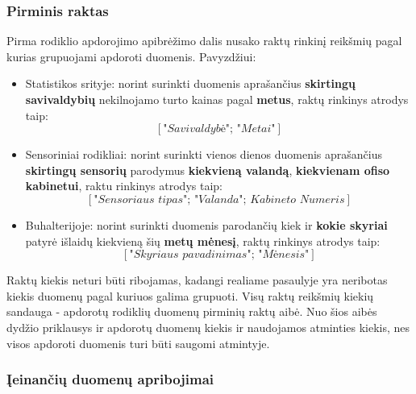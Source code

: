 \documentclass{VUMIFPSbakalaurinis}
\begin{document}
\subsubsection{Pirminis raktas}

Pirma rodiklio apdorojimo apibrėžimo dalis nusako raktų rinkinį reikšmių pagal kurias grupuojami apdoroti duomenis. Pavyzdžiui:
\begin{itemize}
    \item Statistikos srityje: norint surinkti duomenis aprašančius \textbf{skirtingų savivaldybių} nekilnojamo turto kainas pagal \textbf{metus}, raktų rinkinys atrodys taip: \[[\textit{"Savivaldybė"; "Metai"}]\]
    \item Sensoriniai rodikliai: norint surinkti vienos dienos duomenis aprašančius \textbf{skirtingų sensorių} parodymus \textbf{kiekvieną valandą}, \textbf{kiekvienam ofiso kabinetui}, raktu rinkinys atrodys taip: \[[\textit{"Sensoriaus tipas"; "Valanda"; Kabineto Numeris}]\] 
    \item Buhalterijoje: norint surinkti duomenis parodančių kiek ir \textbf{kokie skyriai} patyrė išlaidų kiekvieną šių \textbf{metų mėnesį}, raktų rinkinys atrodys taip: \[[\textit{"Skyriaus pavadinimas"; "Mėnesis"}]\] 
\end{itemize}  \par
Raktų kiekis neturi būti ribojamas, kadangi realiame pasaulyje yra neribotas kiekis duomenų pagal kuriuos galima grupuoti. Visų raktų reikšmių kiekių sandauga - apdorotų rodiklių duomenų pirminių raktų aibė. Nuo šios aibės dydžio priklausys ir apdorotų duomenų kiekis ir naudojamos atminties kiekis, nes visos apdoroti duomenis turi būti saugomi atmintyje. 

\subsubsection{Įeinančių duomenų apribojimai}
\end{document}
